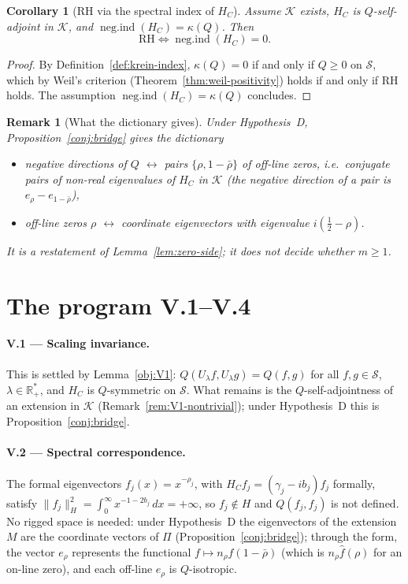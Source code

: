 \documentclass[11pt]{amsart}
\newtheorem{corollary}[theorem]{Corollary}
\newtheorem{remark}[theorem]{Remark}
\newcommand{\kap}{\kappa}
\newcommand{\negind}{\operatorname{neg.ind}}
\newcommand{\Kcal}{\mathcal{K}}
\newcommand{\Scal}{\mathcal{S}}
\newcommand{\Rp}{\mathbb{R}^*_+}
\begin{document}
\begin{corollary}[RH via the spectral index of $H_C$]\label{cor:rh-hc}
Assume $\Kcal$ exists, $H_C$ is $Q$-self-adjoint in $\Kcal$, and $\negind(H_C)=\kap(Q)$.  Then
\[
  \mathrm{RH} \iff \negind(H_C) = 0.
\]
\end{corollary}

\begin{proof}
By Definition~\ref{def:krein-index}, $\kap(Q)=0$ if and only if $Q\ge0$ on $\Scal$, which by
Weil's criterion (Theorem~\ref{thm:weil-positivity}) holds if and only if RH holds.  The
assumption $\negind(H_C)=\kap(Q)$ concludes.
\end{proof}

\begin{remark}[What the dictionary gives]\label{rem:bridge-value}
Under Hypothesis~D, Proposition~\ref{conj:bridge} gives the dictionary
\begin{itemize}
\item negative directions of $Q$ $\longleftrightarrow$ pairs $\{\rho,1-\bar\rho\}$ of off-line
  zeros, i.e.\ conjugate pairs of non-real eigenvalues of $H_C$ in $\Kcal$ (the negative
  direction of a pair is $e_\rho-e_{1-\bar\rho}$),
\item off-line zeros $\rho$ $\longleftrightarrow$ coordinate eigenvectors with eigenvalue
  $i(\tfrac12-\rho)$.
\end{itemize}
It is a restatement of Lemma~\ref{lem:zero-side}; it does not decide whether $m\ge1$.
\end{remark}

\section{The program V.1--V.4}
\label{sec:verification}

\paragraph{\textbf{V.1} --- Scaling invariance.}
This is settled by Lemma~\ref{obj:V1}: $Q(U_\lambda f, U_\lambda g) = Q(f,g)$ for all
$f,g \in \Scal$, $\lambda \in \Rp$, and $H_C$ is $Q$-symmetric on $\Scal$.  What remains is the
$Q$-self-adjointness of an extension in $\Kcal$ (Remark~\ref{rem:V1-nontrivial}); under
Hypothesis~D this is Proposition~\ref{conj:bridge}.

\medskip
\paragraph{\textbf{V.2} --- Spectral correspondence.}
The formal eigenvectors $f_j(x)=x^{-\rho_j}$, with $H_Cf_j=(\gamma_j-ib_j)f_j$ formally,
satisfy $\|f_j\|_H^2=\int_0^\infty x^{-1-2b_j}\,dx=+\infty$, so $f_j\notin H$ and $Q(f_j,f_j)$ is
not defined.  No rigged space is needed: under Hypothesis~D the eigenvectors of the extension $M$
are the coordinate vectors of $\Pi$ (Proposition~\ref{conj:bridge}); through the form, the vector
$e_\rho$ represents the functional $f\mapsto n_\rho\hat f(1-\bar\rho)$ (which is
$n_\rho\hat f(\rho)$ for an on-line zero), and each off-line $e_\rho$ is $Q$-isotropic.
\end{document}
